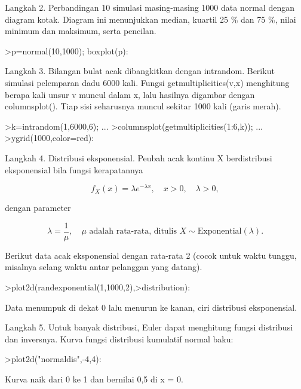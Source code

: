 \documentclass[a4paper,10pt]{article}
\begin{document}
\begin{eulernotebook}
\begin{eulercomment}
\begin{eulercomment}
\begin{eulercomment}
\begin{eulercomment}
\begin{eulercomment}
\begin{eulercomment}
\begin{eulercomment}
\begin{eulercomment}
\begin{eulercomment}
\begin{eulercomment}
\begin{eulercomment}
Langkah 2. Perbandingan 10 simulasi masing-masing 1000 data normal dengan diagram kotak.
Diagram ini menunjukkan median, kuartil 25 \% dan 75 \%, nilai minimum dan maksimum, serta
pencilan.
\end{eulercomment}
\begin{eulerprompt}
>p=normal(10,1000); boxplot(p):
\end{eulerprompt}
\begin{eulercomment}
Langkah 3. Bilangan bulat acak dibangkitkan dengan intrandom. Berikut simulasi pelemparan
dadu 6000 kali. Fungsi getmultiplicities(v,x) menghitung berapa kali unsur v muncul dalam
x, lalu hasilnya digambar dengan columnsplot(). Tiap sisi seharusnya muncul sekitar 1000
kali (garis merah).
\end{eulercomment}
\begin{eulerprompt}
>k=intrandom(1,6000,6);  ...
>columnsplot(getmultiplicities(1:6,k));  ...
>ygrid(1000,color=red):
\end{eulerprompt}
\begin{eulercomment}
Langkah 4. Distribusi eksponensial. Peubah acak kontinu X berdistribusi eksponensial bila
fungsi kerapatannya
\end{eulercomment}
\begin{eulerformula}
\[
f_X(x)=\lambda e^{-\lambda x},\quad x>0,\quad \lambda>0,
\]
\end{eulerformula}
\begin{eulercomment}
dengan parameter
\end{eulercomment}
\begin{eulerformula}
\[
\lambda=\frac{1}{\mu},\quad \mu \text{ adalah rata-rata, ditulis } X \sim \text{Exponential}(\lambda).
\]
\end{eulerformula}
\begin{eulercomment}
Berikut data acak eksponensial dengan rata-rata 2 (cocok untuk waktu tunggu, misalnya
selang waktu antar pelanggan yang datang).
\end{eulercomment}
\begin{eulerprompt}
>plot2d(randexponential(1,1000,2),>distribution):
\end{eulerprompt}
\begin{eulercomment}
Data menumpuk di dekat 0 lalu menurun ke kanan, ciri distribusi eksponensial.

Langkah 5. Untuk banyak distribusi, Euler dapat menghitung fungsi distribusi dan
inversnya. Kurva fungsi distribusi kumulatif normal baku:
\end{eulercomment}
\begin{eulerprompt}
>plot2d("normaldis",-4,4):
\end{eulerprompt}
\begin{eulercomment}
Kurva naik dari 0 ke 1 dan bernilai 0,5 di x = 0.


\end{eulercomment}
\end{eulercomment}
\end{eulercomment}
\end{eulercomment}
\end{eulercomment}
\end{eulercomment}
\end{eulercomment}
\end{eulercomment}
\end{eulercomment}
\end{eulercomment}
\end{eulercomment}
\end{eulernotebook}
\end{document}
